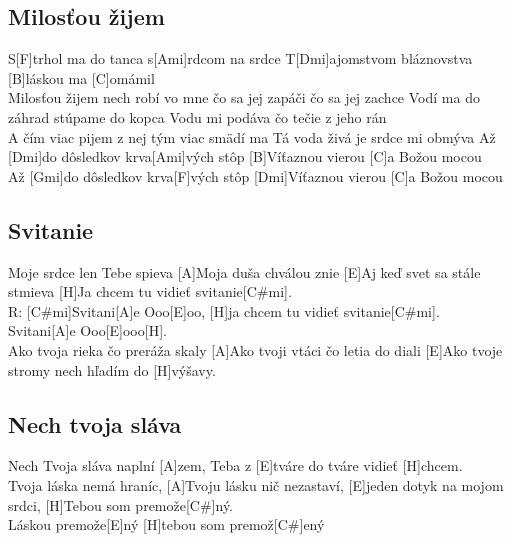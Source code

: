 \documentclass[10pt]{article}
\begin{document}
\begin{Large}
\begin{minipage}{\textwidth}
\subsection{Milosťou žijem}
\begin{multicols*}{3}
	\begin{guitar}
		S[F]trhol ma do tanca
		s[Ami]rdcom na srdce
		T[Dmi]ajomstvom bláznovstva
		[B]láskou ma [C]omámil
		\\
		Milosťou žijem
		nech robí vo mne
		čo sa jej zapáči
		čo sa jej zachce
		\columnbreak
		Vodí ma do záhrad
		stúpame do kopca
		Vodu mi podáva
		čo tečie z jeho rán
		\\
		A čím viac pijem z nej
		tým viac smädí ma
		Tá voda živá je
		srdce mi obmýva
		\columnbreak
		Až [Dmi]do dôsledkov
		krva[Ami]vých stôp
		[B]Víťaznou vierou
		[C]a Božou mocou
		\\
		Až [Gmi]do dôsledkov
		krva[F]vých stôp
		[Dmi]Víťaznou vierou
		[C]a Božou mocou
	\end{guitar}
\end{multicols*}
\end{minipage}

\begin{minipage}{\textwidth}
\begin{multicols*}{2}
\subsection{Svitanie}
\begin{guitar}
	[C#mi]Moje srdce len Tebe spieva
	[A]Moja duša chválou znie
	[E]Aj keď svet sa stále stmieva
	[H]Ja chcem tu vidieť svitanie[C#mi].
	\\
	R: [C#mi]Svitani[A]e Ooo[E]oo,
	[H]ja chcem tu vidieť svitanie[C#mi].
	Svitani[A]e Ooo[E]ooo[H].
	\\
	[C#mi]Ako tvoja rieka čo preráža skaly
	[A]Ako tvoji vtáci čo letia do diali
	[E]Ako tvoje stromy nech hľadím do [H]výšavy.
\end{guitar}
\columnbreak
\subsection{Nech tvoja sláva}
\begin{guitar}
	[C#]Nech Tvoja sláva naplní [A]zem,
	Teba z [E]tváre do tváre vidieť [H]chcem.
	\\
	[C#]Tvoja láska nemá hraníc, 
	[A]Tvoju lásku nič nezastaví,
	[E]jeden dotyk na mojom srdci, 
	[H]Tebou som premože[C#]ný.
	\\
	[A]Láskou premože[E]ný
	[H]tebou som premož[C#]ený
\end{guitar}
\end{multicols*}
\end{minipage}


\end{Large}
\end{document}
